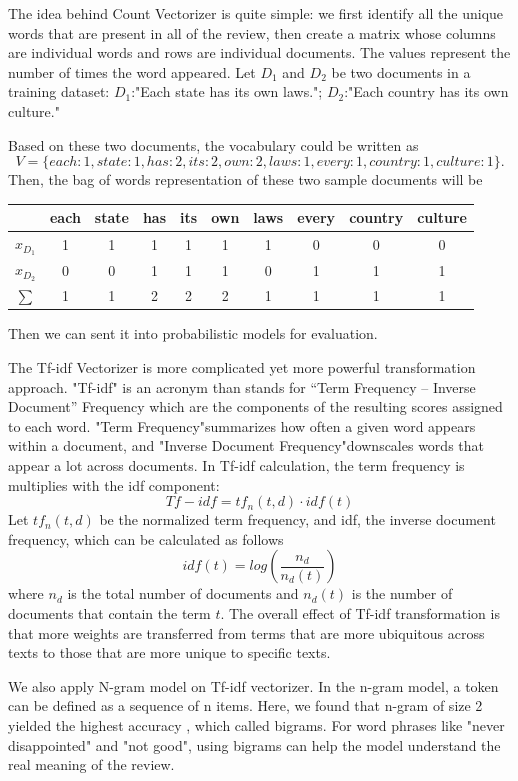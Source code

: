 \documentclass{article}
\begin{document}
The idea behind Count Vectorizer is quite simple: we first identify all the unique words that are present in all of the review, then create a matrix whose columns are individual words and rows are individual documents. The values represent the number of times the word appeared. 
Let $D_1$ and $D_2$ be two documents in a training dataset: $D_1$:"Each state has its own laws.";
$D_2$:"Each country has its own culture."

Based on these two documents, the vocabulary could be written as 
\[
V = \{each:1,state:1,has:2,its:2,own:2,laws:1,every:1,country:1,culture:1\}.
\]
Then, the bag of words representation of these two sample documents will be 

\begin{center}
\begin{tabular}{ |c|c|c|c|c|c|c|c|c|c| } 
 \hline
  & each & state&has&its&own&laws&every&country&culture\\ 
 \hline
$x_{D_1}$ & 1 & 1& 1&1&1&1&0&0&0 \\ 
 \hline
$x_{D_2}$ & 0&0&1&1&1&0&1&1&1 \\ 
 \hline
$\sum$ & 1&1&2&2&2&1&1&1&1 \\ 
 \hline
\end{tabular}
\end{center}
Then we can sent it into probabilistic models for evaluation. 

The Tf-idf Vectorizer is more complicated yet more powerful transformation approach. "Tf-idf" is an acronym than stands for “Term Frequency – Inverse Document” Frequency which are the components of the resulting scores assigned to each word. "Term Frequency"summarizes how often a given word appears within a document, and "Inverse Document Frequency"downscales words that appear a lot across documents. In Tf-idf calculation, the term frequency is multiplies with the idf component:
\[
Tf-idf = tf_n(t,d)\cdot idf(t)
\]
Let $tf_n(t,d)$ be the normalized term frequency, and idf, the inverse document frequency, which can be calculated as follows
\[
idf(t)=log(\frac{n_d}{n_{d}(t)})
\]
where $n_d$ is the total number of documents and $n_{d}(t)$ is the number of documents that contain the term $t$. The overall effect of Tf-idf transformation is that more weights are transferred from terms that are more ubiquitous across texts to those that are more unique to specific texts. 

We also apply N-gram model on Tf-idf vectorizer. In the n-gram model, a token can be defined as a sequence of n items. Here, we found that n-gram of size 2 yielded the highest accuracy , which called bigrams. For word phrases like "never disappointed" and "not good", using bigrams can help the model understand the real meaning of the review.
\end{document}
